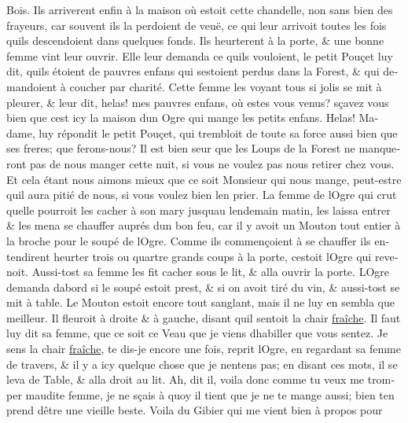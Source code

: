 \documentclass[14pt,a4paper]{memoir}
\newcommand{\ul}[1]{\uline{#1}}
\begin{document}
\begin{otherlanguage}{french}
Bois. Ils arriverent enfin à la maison où estoit cette chandelle, non
sans bien des frayeurs, car souvent ils la perdoient de veuë, ce qui
leur arrivoit toutes les fois qu\textquotesingle ils descendoient dans
quelques fonds. Ils heurterent à la porte, \& une bonne femme vint leur
ouvrir. Elle leur demanda ce qu\textquotesingle ils vouloient, le petit
Pouçet luy dit, qu\textquotesingle ils étoient de pauvres enfans qui
s\textquotesingle estoient perdus dans la Forest, \& qui demandoient à
coucher par charité. Cette femme les voyant tous si jolis se mit à
pleurer, \& leur dit, helas! mes pauvres enfans, où estes vous venus?
sçavez vous bien que c\textquotesingle est icy la maison
d\textquotesingle un Ogre qui mange les petits enfans. Helas! Madame,
luy répondit le petit Pouçet, qui trembloit de toute sa force aussi bien
que ses freres; que ferons-nous? Il est bien seur que les Loups de la
Forest ne manqueront pas de nous manger cette nuit, si vous ne voulez
pas nous retirer chez vous. Et cela étant nous aimons mieux que ce soit
Monsieur qui nous mange, peut-estre qu\textquotesingle il aura pitié de
nous, si vous voulez bien l\textquotesingle en prier. La femme de
l\textquotesingle Ogre qui crut qu\textquotesingle elle pourroit les
cacher à son mary jusqu\textquotesingle au lendemain matin, les laissa
entrer \& les mena se chauffer auprés d\textquotesingle un bon feu, car
il y avoit un Mouton tout entier à la broche pour le soupé de
l\textquotesingle Ogre. Comme ils commençoient à se chauffer ils
entendirent heurter trois ou quartre grands coups à la porte,
c\textquotesingle estoit l\textquotesingle Ogre qui revenoit. Aussi-tost
sa femme les fit cacher sous le lit, \& alla ouvrir la porte.
L\textquotesingle Ogre demanda d\textquotesingle abord si le soupé
estoit prest, \& si on avoit tiré du vin, \& aussi-tost se mit à table.
Le Mouton estoit encore tout sanglant, mais il ne luy en sembla que
meilleur. Il fleuroit à droite \& à gauche, disant qu\textquotesingle il
sentoit la chair \ul{fraîche}. Il faut luy dit sa femme, que ce soit ce
Veau que je viens d\textquotesingle habiller que vous sentez. Je sens la
chair \ul{fraîche}, te dis-je encore une fois, reprit
l\textquotesingle Ogre, en regardant sa femme de travers, \& il y a icy
quelque chose que je n\textquotesingle entens pas; en disant ces mots,
il se leva de Table, \& alla droit au lit. Ah, dit il, voila donc comme
tu veux me tromper maudite femme, je ne sçais à quoy il tient que je ne
te mange aussi; bien t\textquotesingle en prend d\textquotesingle être
une vieille beste. Voila du Gibier qui me vient bien à propos pour

\end{otherlanguage}
\end{document}
